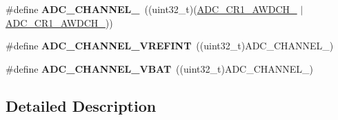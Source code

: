 \begin{DoxyCompactItemize}
\item 
\mbox{\label{group___a_d_c__channels_ga30fc8e77b4c89d3ea0609cfbc7fc90fd}} 
\#define {\bfseries A\+D\+C\+\_\+\+C\+H\+A\+N\+N\+E\+L\+\_}~((uint32\+\_\+t)(\mbox{\hyperlink{group___peripheral___registers___bits___definition_gaf37f3c0d7c72192803d0772e076cf8ee}{A\+D\+C\+\_\+\+C\+R1\+\_\+\+A\+W\+D\+C\+H\+\_}} $\vert$ \mbox{\hyperlink{group___peripheral___registers___bits___definition_gafcd37244d74db7c9a34a4f08b94301ae}{A\+D\+C\+\_\+\+C\+R1\+\_\+\+A\+W\+D\+C\+H\+\_}}))
\item 
\mbox{\label{group___a_d_c__channels_ga2647a044275a295693e8fb01db3172f9}} 
\#define {\bfseries A\+D\+C\+\_\+\+C\+H\+A\+N\+N\+E\+L\+\_\+\+V\+R\+E\+F\+I\+NT}~((uint32\+\_\+t)A\+D\+C\+\_\+\+C\+H\+A\+N\+N\+E\+L\+\_)
\item 
\mbox{\label{group___a_d_c__channels_ga60210f1e9305301dea9e42afedd9093f}} 
\#define {\bfseries A\+D\+C\+\_\+\+C\+H\+A\+N\+N\+E\+L\+\_\+\+V\+B\+AT}~((uint32\+\_\+t)A\+D\+C\+\_\+\+C\+H\+A\+N\+N\+E\+L\+\_)
\end{DoxyCompactItemize}


\subsection{Detailed Description}
